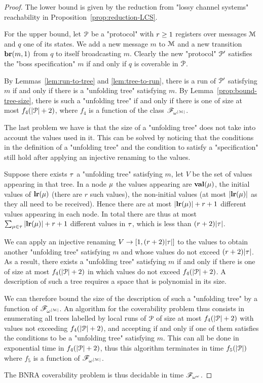 \ifproofs
\begin{proof}
	The lower bound is given by the reduction from "lossy channel systems" reachability in Proposition~\ref{prop:reduction-LCS}.
	
	For the upper bound, let $\mathcal{P}$ be a "protocol" with $r \geq 1$ registers over messages $\mathcal{M}$ and $q$ one of its states. We add a new message $m$ to $\mathcal{M}$ and a new transition $\textbf{br}(m, 1)$ from $q$ to itself broadcasting $m$. 
	Clearly the new "protocol" $\mathcal{P}'$ satisfies the "boss specification" $m$ if and only if $q$ is coverable in $\mathcal{P}$.
	
	By Lemmas~\ref{lem:run-to-tree} and \ref{lem:tree-to-run}, there is a run of $\mathcal{P}'$ satisfying $m$ if and only if there is a "unfolding tree" satisfying $m$.
	By Lemma~\ref{prop:bound-tree-size}, there is such a "unfolding tree" if and only if there is one of size at most $f_4(|\mathcal{P}|+2)$, where $f_4$ is a function of the class $\mathscr{F}_{\omega^{|\mathcal{M}|}}$.
	
	The last problem we have is that the size of a "unfolding tree" does not take into account the values used in it. This can be solved by noticing that the conditions in the definition of a "unfolding tree" and the condition to satisfy a "specification" still hold after applying an injective renaming to the values. 
	
	Suppose there exists $\tau$ a "unfolding tree" satisfying $m$, let $V$ be the set of values appearing in that tree. In a node $\mu$ the values appearing are $\mathbf{val}(\mu)$, the initial values of $\mathbf{lr}(\mu)$ (there are $r$ such values), the non-initial values (at most $|\mathbf{lr}(\mu)|$ as they all need to be received).
	Hence there are at most $|\mathbf{lr}(\mu)| + r +1$ different values appearing in each node.
	In total there are thus at most $\sum_{\mu \in \tau} |\mathbf{lr}(\mu)| + r +1$ different values in $\tau$, which is less than $(r+2)|\tau|$.
	
	We can apply an injective renaming $V \to [1,(r+2)|\tau|]$ to the values to obtain another "unfolding tree" satisfying $m$ and whose values do not exceed $(r+2)|\tau|$.
	As a result, there exists a "unfolding tree" satisfying $m$ if and only if there is one of size at most $f_4(|\mathcal{P}|+2)$ in which values do not exceed $f_4(|\mathcal{P}|+2)$. A description of such a tree requires a space that is polynomial in its size.
	
	We can therefore bound the size of the description of such a "unfolding tree" by a function of $\mathscr{F}_{\omega^{|\mathcal{M}|}}$.
	An algorithm for the coverability problem thus consists in enumerating all trees labelled by local runs of $\mathcal{P}$ of size at most $f_4(|\mathcal{P}|+2)$ with values not exceeding $f_4(|\mathcal{P}|+2)$, and accepting if and only if one of them satisfies the conditions to be a "unfolding tree" satisfying $m$.
	This can all be done in exponential time in $f_4(|\mathcal{P}|+2)$, thus this algorithm terminates in time $f_5(|\mathcal{P}|)$ where $f_5$ is a function of $\mathscr{F}_{\omega^{|\mathcal{M}|}}$.
	
	The BNRA coverability problem is thus decidable in time $\mathscr{F}_{\omega^\omega}$.
\end{proof}
\fi
